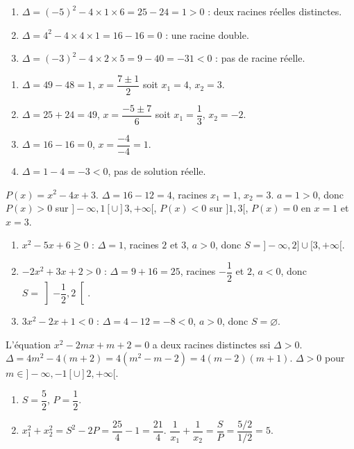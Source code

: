 \begin{enumerate}[label=\alph*)]
  \item $\Delta = (-5)^2 - 4\times 1\times 6 = 25 - 24 = 1 > 0$ : deux racines réelles distinctes.
  \item $\Delta = 4^2 - 4\times 4\times 1 = 16 - 16 = 0$ : une racine double.
  \item $\Delta = (-3)^2 - 4\times 2\times 5 = 9 - 40 = -31 < 0$ : pas de racine réelle.
\end{enumerate}

\begin{enumerate}[label=\alph*)]
  \item $\Delta = 49 - 48 = 1$, $x = \dfrac{7 \pm 1}{2}$ soit $x_1 = 4$, $x_2 = 3$.
  \item $\Delta = 25 + 24 = 49$, $x = \dfrac{-5 \pm 7}{6}$ soit $x_1 = \dfrac{1}{3}$, $x_2 = -2$.
  \item $\Delta = 16 - 16 = 0$, $x = \dfrac{-4}{-4} = 1$.
  \item $\Delta = 1 - 4 = -3 < 0$, pas de solution réelle.
\end{enumerate}

$P(x) = x^2 - 4x + 3$. $\Delta = 16 - 12 = 4$, racines $x_1 = 1$, $x_2 = 3$. $a = 1 > 0$, donc $P(x) > 0$ sur $]-\infty, 1[ \cup ]3, +\infty[$, $P(x) < 0$ sur $]1, 3[$, $P(x) = 0$ en $x=1$ et $x=3$.

\begin{enumerate}[label=\alph*)]
  \item $x^2 - 5x + 6 \geq 0$ : $\Delta = 1$, racines $2$ et $3$, $a>0$, donc $S = ]-\infty, 2] \cup [3, +\infty[$.
  \item $-2x^2 + 3x + 2 > 0$ : $\Delta = 9 + 16 = 25$, racines $-\dfrac{1}{2}$ et $2$, $a<0$, donc $S = \left]-\dfrac{1}{2}, 2\right[$.
  \item $3x^2 - 2x + 1 < 0$ : $\Delta = 4 - 12 = -8 < 0$, $a>0$, donc $S = \varnothing$.
\end{enumerate}

L'équation $x^2 - 2mx + m + 2 = 0$ a deux racines distinctes ssi $\Delta > 0$. $\Delta = 4m^2 - 4(m+2) = 4(m^2 - m - 2) = 4(m-2)(m+1)$. $\Delta > 0$ pour $m \in ]-\infty, -1[ \cup ]2, +\infty[$.

\begin{enumerate}[label=\alph*)]
  \item $S = \dfrac{5}{2}$, $P = \dfrac{1}{2}$.
  \item $x_1^2 + x_2^2 = S^2 - 2P = \dfrac{25}{4} - 1 = \dfrac{21}{4}$. $\dfrac{1}{x_1} + \dfrac{1}{x_2} = \dfrac{S}{P} = \dfrac{5/2}{1/2} = 5$.
\end{enumerate}

